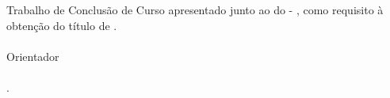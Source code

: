 %
%

\makeatletter
\begin{folhaderosto}
	\thispagestyle{empty}%
	
    \begin{center}
    
		\small\textbf{\expandafter\uppercase\expandafter{\imprimirnomeautor}}\\
		\vspace*{6.2 cm}%
		\normalsize\textbf{\expandafter\uppercase\expandafter{\imprimirtitulotb}}\\
		
    \end{center}
	
	\vspace*{2.35 cm}%
		    \large%
    		\hfill%
	    	\begin{minipage}{8 cm}%
	    		\begin{small} %
	    		\setlength{\baselineskip}{0.7\baselineskip}
				
		    	{Trabalho de Conclusão de Curso apresentado junto ao {\imprimirprograma }
		    	{\imprimirmodalidade} do {\imprimirinstituicao}{ - }{\imprimirdepartamento},
		    	como requisito à obtenção do título de
		    	{\imprimirgrau }.}\\{
		    	}\\Orientador\\ \\
		    	{\imprimirtitulacaoorientador }{ }{\imprimirorientador.}\\\\ 
				
				
				\end{small} %
		    \end{minipage}%
		    	
		    \vspace*{6 cm}%
		    
		    \begin{center} %
		    	\normalsize %
	    		\textbf{\imprimirlocalapresentacao 
	    		\\\imprimirdataapresentacao}
	    	\end{center}%

\end{folhaderosto}
\makeatother
